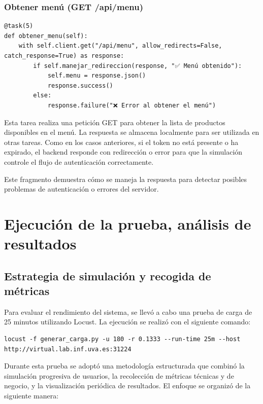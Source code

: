 \documentclass[10pt]{book}
\begin{document}
\subsubsection{Obtener menú (GET /api/menu)}

\begin{lstlisting}[style=pythonclean, caption={Tarea para obtener el menú de productos}]
@task(5)
def obtener_menu(self):
    with self.client.get("/api/menu", allow_redirects=False, catch_response=True) as response:
        if self.manejar_redireccion(response, "✅ Menú obtenido"):
            self.menu = response.json()
            response.success()
        else:
            response.failure("❌ Error al obtener el menú")
\end{lstlisting}

Esta tarea realiza una petición GET para obtener la lista de productos disponibles en el menú. La respuesta se almacena localmente para ser utilizada en otras tareas. Como en los casos anteriores, si el token no está presente o ha expirado, el backend responde con redirección o error para que la simulación controle el flujo de autenticación correctamente.


Este fragmento demuestra cómo se maneja la respuesta para detectar posibles problemas de autenticación o errores del servidor.

\newpage
\section{Ejecución de la prueba, análisis de resultados}

\subsection{Estrategia de simulación y recogida de métricas}
\cite{xantygc_locust}
Para evaluar el rendimiento del sistema, se llevó a cabo una prueba de carga de 25 minutos utilizando Locust. La ejecución se realizó con el siguiente comando:

\begin{lstlisting}[style=simplebash]
locust -f generar_carga.py -u 180 -r 0.1333 --run-time 25m --host http://virtual.lab.inf.uva.es:31224
\end{lstlisting}

Durante esta prueba se adoptó una metodología estructurada que combinó la simulación progresiva de usuarios, la recolección de métricas técnicas y de negocio, y la visualización periódica de resultados. El enfoque se organizó de la siguiente manera:
\end{document}
